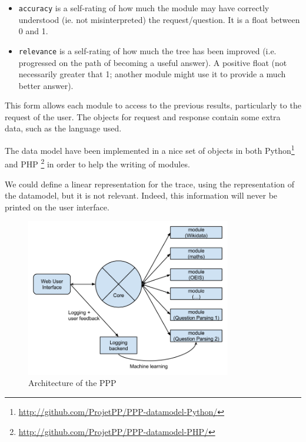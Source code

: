 \begin{itemize}
    \item \texttt{accuracy} is a self-rating of how much the module may have correctly understood (ie. not misinterpreted) the request/question. It is a float between 0 and 1.
    \item \texttt{relevance} is a self-rating of how much the tree has been improved (i.e. progressed on the path of becoming a useful answer). A positive float (not necessarily greater that 1; another module might use it to provide a much better answer).
\end{itemize}

This form allows each module to access to the previous results, particularly to the request of the user. The objects for request and response contain some extra data, such as the language used.

The data model have been implemented in a nice set of objects in both Python\footnote{\url{http://github.com/ProjetPP/PPP-datamodel-Python/}} and PHP \footnote{\url{http://github.com/ProjetPP/PPP-datamodel-PHP/}} in order to help the writing of modules.

We could define a linear representation for the trace, using the representation of the datamodel, but it is not relevant. Indeed, this information will never be printed on the user interface.

\begin{figure}[!ht]
  \centering
    \label{datamodel:struct}
    \caption{Architecture of the PPP}
    \includegraphics[width=0.8\textwidth]{../ppp_structure.png}
\end{figure}
